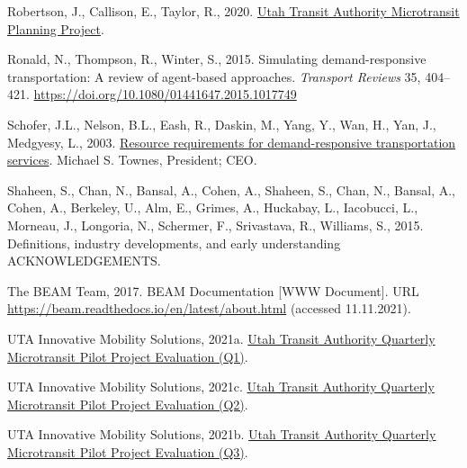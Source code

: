 \documentclass[
]{report}
\newlength{\cslhangindent}
\newlength{\cslentryspacingunit} %
\newenvironment{CSLReferences}[2] %
 {%
  \setlength{\parindent}{0pt}
  \ifodd #1
  \let\oldpar\par
  \def\par{\hangindent=\cslhangindent\oldpar}
  \fi
  \setlength{\parskip}{#2\cslentryspacingunit}
 }%
 {}
\begin{document}
\begin{CSLReferences}{1}{0}
\leavevmode{}%
Robertson, J., Callison, E., Taylor, R., 2020. \href{https://www.rideuta.com/-/media/Files/About-UTA/Reports/2021/UTA_Microtransit_Consulting_Report_Final.ashx?la=en}{{Utah Transit Authority Microtransit Planning Project}}.

\leavevmode{}%
Ronald, N., Thompson, R., Winter, S., 2015. Simulating demand-responsive transportation: A review of agent-based approaches. \emph{Transport Reviews} 35, 404--421. \url{https://doi.org/10.1080/01441647.2015.1017749}

\leavevmode{}%
Schofer, J.L., Nelson, B.L., Eash, R., Daskin, M., Yang, Y., Wan, H., Yan, J., Medgyesy, L., 2003. \href{http://www.national-academies.org/trb/bookstore}{Resource requirements for demand-responsive transportation services}. Michael S. Townes, President; CEO.

\leavevmode{}%
Shaheen, S., Chan, N., Bansal, A., Cohen, A., Shaheen, S., Chan, N., Bansal, A., Cohen, A., Berkeley, U., Alm, E., Grimes, A., Huckabay, L., Iacobucci, L., Morneau, J., Longoria, N., Schermer, F., Srivastava, R., Williams, S., 2015. Definitions, industry developments, and early understanding ACKNOWLEDGEMENTS.

\leavevmode{}%
The BEAM Team, 2017. {BEAM Documentation} {[}WWW Document{]}. URL \url{https://beam.readthedocs.io/en/latest/about.html} (accessed 11.11.2021).

\leavevmode{}%
UTA Innovative Mobility Solutions, 2021a. \href{https://www.rideuta.com/-/media/Files/Services/Via/Final_UTA_microtransit_pilot_Q1_report.ashx?la=en}{{Utah Transit Authority Quarterly Microtransit Pilot Project Evaluation (Q1)}}.

\leavevmode{}%
UTA Innovative Mobility Solutions, 2021c. \href{https://www.rideuta.com/-/media/Files/Services/Via/Final_UTA_Microtransit_Pilot_Q2_Report.ashx?la=en}{{Utah Transit Authority Quarterly Microtransit Pilot Project Evaluation (Q2)}}.

\leavevmode{}%
UTA Innovative Mobility Solutions, 2021b. \href{https://www.rideuta.com/-/media/Files/Services/Via/Final_UTA_Microtransit_Pilot_Q3_Report.ashx?la=en}{{Utah Transit Authority Quarterly Microtransit Pilot Project Evaluation (Q3)}}.


\end{CSLReferences}
\end{document}
